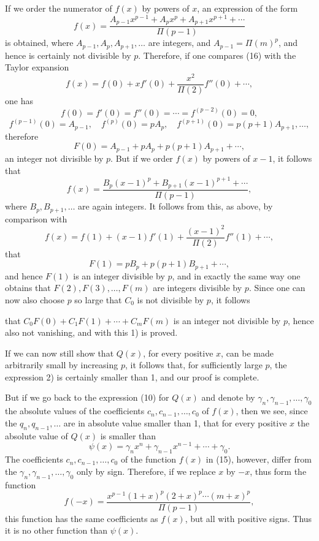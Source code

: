 \documentclass[11pt]{article}
\begin{document}
If we order the numerator of $f(x)$ by powers of $x$, an expression of the form
\begin{equation}\tag{16}
f(x)=\frac{A_{p-1}x^{p-1}+A_px^p+A_{p+1}x^{p+1}+\cdots}{\Pi(p-1)}
\end{equation}
is obtained, where $A_{p-1},A_p,A_{p+1},\ldots$ are integers, and $A_{p-1}=\Pi(m)^p$, and hence is certainly not divisible by $p$. Therefore, if one compares (16) with the Taylor expansion
\[
f(x)=f(0)+xf'(0)+\frac{x^2}{\Pi(2)}f''(0)+\cdots,
\]
one has
\[
f(0)=f'(0)=f''(0)=\cdots=f^{(p-2)}(0)=0,
\]
\[
f^{(p-1)}(0)=A_{p-1},\quad f^{(p)}(0)=pA_p,\quad
f^{(p+1)}(0)=p(p+1)A_{p+1},\ldots,
\]
therefore
\[
F(0)=A_{p-1}+pA_p+p(p+1)A_{p+1}+\cdots,
\]
an integer not divisible by $p$. But if we order $f(x)$ by powers of $x-1$, it follows that
\[
f(x)=\frac{B_p(x-1)^p+B_{p+1}(x-1)^{p+1}+\cdots}{\Pi(p-1)},
\]
where $B_p,B_{p+1},\ldots$ are again integers. It follows from this, as above, by comparison with
\[
f(x)=f(1)+(x-1)f'(1)+\frac{(x-1)^2}{\Pi(2)}f''(1)+\cdots,
\]
that
\[
F(1)=pB_p+p(p+1)B_{p+1}+\cdots,
\]
and hence $F(1)$ is an integer divisible by $p$, and in exactly the same way one obtains that $F(2),F(3),\ldots,F(m)$ are integers divisible by $p$. Since one can now also choose $p$ so large that $C_0$ is not divisible by $p$, it follows

that $C_0F(0)+C_1F(1)+\cdots+C_mF(m)$ is an integer not divisible by $p$, hence also not vanishing, and with this 1) is proved.

If we can now still show that $Q(x)$, for every positive $x$, can be made arbitrarily small by increasing $p$, it follows that, for sufficiently large $p$, the expression 2) is certainly smaller than 1, and our proof is complete.

But if we go back to the expression (10) for $Q(x)$ and denote by $\gamma_n,\gamma_{n-1},\ldots,\gamma_0$ the absolute values of the coefficients $c_n,c_{n-1},\ldots,c_0$ of $f(x)$, then we see, since the $q_n,q_{n-1},\ldots$ are in absolute value smaller than 1, that for every positive $x$ the absolute value of $Q(x)$ is smaller than
\begin{equation}\tag{17}
\psi(x)=\gamma_nx^n+\gamma_{n-1}x^{n-1}+\cdots+\gamma_0.
\end{equation}
The coefficients $c_n,c_{n-1},\ldots,c_0$ of the function $f(x)$ in (15), however, differ from the $\gamma_n,\gamma_{n-1},\ldots,\gamma_0$ only by sign. Therefore, if we replace $x$ by $-x$, thus form the function
\[
f(-x)=\frac{x^{p-1}(1+x)^p(2+x)^p\cdots(m+x)^p}{\Pi(p-1)},
\]
this function has the same coefficients as $f(x)$, but all with positive signs. Thus it is no other function than $\psi(x)$.
\end{document}
